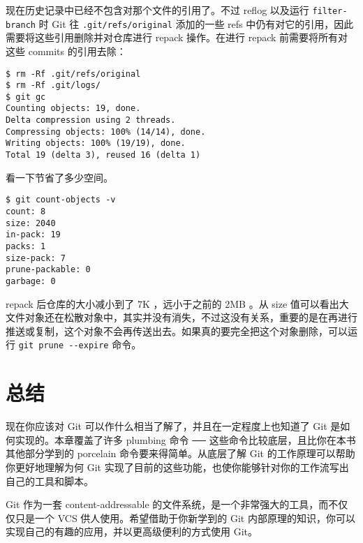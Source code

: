 \documentclass[a4paper]{book}
\begin{document}
现在历史记录中已经不包含对那个文件的引用了。不过 reflog 以及运行 \texttt{filter-branch} 时 Git 往 \texttt{.git/refs/original} 添加的一些 refs 中仍有对它的引用，因此需要将这些引用删除并对仓库进行 repack 操作。在进行 repack 前需要将所有对这些 commits 的引用去除：

\begin{shaded}\begin{verbatim}
$ rm -Rf .git/refs/original
$ rm -Rf .git/logs/
$ git gc
Counting objects: 19, done.
Delta compression using 2 threads.
Compressing objects: 100% (14/14), done.
Writing objects: 100% (19/19), done.
Total 19 (delta 3), reused 16 (delta 1)
\end{verbatim}\end{shaded}

看一下节省了多少空间。

\begin{shaded}\begin{verbatim}
$ git count-objects -v
count: 8
size: 2040
in-pack: 19
packs: 1
size-pack: 7
prune-packable: 0
garbage: 0
\end{verbatim}\end{shaded}

repack 后仓库的大小减小到了 7K ，远小于之前的 2MB 。从 size 值可以看出大文件对象还在松散对象中，其实并没有消失，不过这没有关系，重要的是在再进行推送或复制，这个对象不会再传送出去。如果真的要完全把这个对象删除，可以运行 \texttt{git prune -{}-expire} 命令。

\section{总结}

现在你应该对 Git 可以作什么相当了解了，并且在一定程度上也知道了 Git 是如何实现的。本章覆盖了许多 plumbing 命令 ── 这些命令比较底层，且比你在本书其他部分学到的 porcelain 命令要来得简单。从底层了解 Git 的工作原理可以帮助你更好地理解为何 Git 实现了目前的这些功能，也使你能够针对你的工作流写出自己的工具和脚本。

Git 作为一套 content-addressable 的文件系统，是一个非常强大的工具，而不仅仅只是一个 VCS 供人使用。希望借助于你新学到的 Git 内部原理的知识，你可以实现自己的有趣的应用，并以更高级便利的方式使用 Git。
\end{document}
